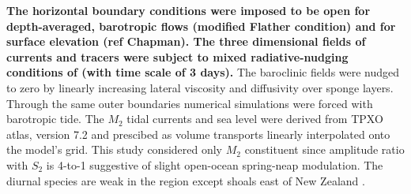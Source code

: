 \documentclass[12pt]{article}
\begin{document}
\textbf{The horizontal boundary conditions were imposed to be open for depth-averaged, barotropic 
flows 
(modified Flather condition) and for surface elevation (ref Chapman). The three dimensional fields 
of currents and tracers were subject to mixed radiative-nudging conditions of 
\cite{marchesiello2001open} (with time scale of 3 days).} The baroclinic fields were  
nudged to zero by linearly increasing lateral viscosity and diffusivity over sponge layers. Through 
the same outer boundaries numerical simulations were forced with barotropic tide. The $M_2$ tidal 
currents and sea level were derived from TPXO atlas, version 7.2 \citep{egbert2002efficient} and 
prescibed as volume transports linearly interpolated onto the model's grid. This study considered 
only $M_2$ constituent since amplitude ratio with $S_2$ is 4-to-1 suggestive of 
slight open-ocean 
spring-neap modulation. The diurnal species are weak in the region except shoals east of New 
Zealand \citep{walters2001ocean}.\\
\end{document}
